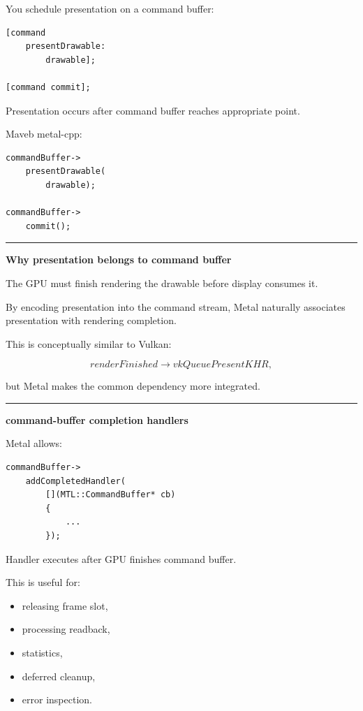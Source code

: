You schedule presentation on a command buffer:

\begin{verbatim}
[command
    presentDrawable:
        drawable];

[command commit];
\end{verbatim}

Presentation occurs after command buffer reaches appropriate point.

Maveb metal-cpp:

\begin{verbatim}
commandBuffer->
    presentDrawable(
        drawable);

commandBuffer->
    commit();
\end{verbatim}

\begin{center}\rule{0.5\linewidth}{0.5pt}\end{center}

\textbf{Why presentation belongs to command buffer}

The GPU must finish rendering the drawable before display consumes it.

By encoding presentation into the command stream, Metal naturally associates presentation with rendering completion.

This is conceptually similar to Vulkan:

\[
renderFinished
\rightarrow
vkQueuePresentKHR,
\]

but Metal makes the common dependency more integrated.

\begin{center}\rule{0.5\linewidth}{0.5pt}\end{center}

\textbf{command-buffer completion handlers}

Metal allows:

\begin{verbatim}
commandBuffer->
    addCompletedHandler(
        [](MTL::CommandBuffer* cb)
        {
            ...
        });
\end{verbatim}

Handler executes after GPU finishes command buffer.

This is useful for:

\begin{itemize}
\tightlist
\item
  releasing frame slot,
\item
  processing readback,
\item
  statistics,
\item
  deferred cleanup,
\item
  error inspection.
\end{itemize}

